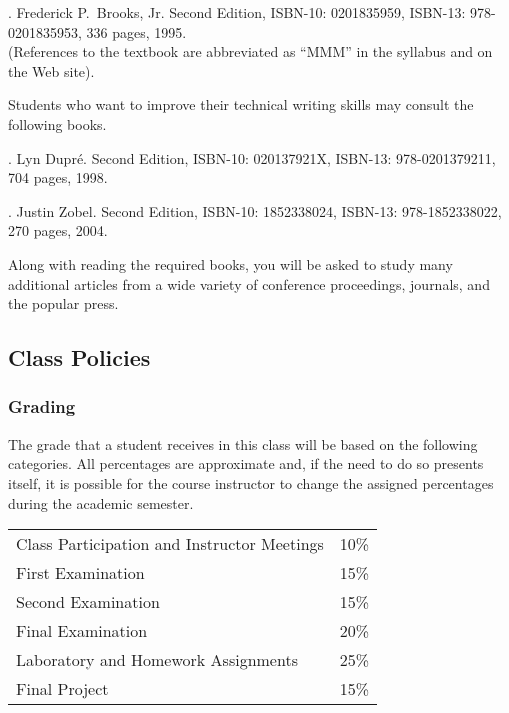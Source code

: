 . Frederick P.\ Brooks, Jr.
Second Edition, ISBN-10: 0201835959, ISBN-13: 978-0201835953, 336 pages, 1995. \\
(References to the textbook are abbreviated as ``MMM'' in the syllabus and on the Web site).

\noindent
Students who want to improve their technical writing skills may consult the following books.

. Lyn Dupr\'e. Second Edition,  ISBN-10: 020137921X,
ISBN-13: 978-0201379211, 704 pages, 1998.

.  Justin Zobel. Second Edition,  ISBN-10: 1852338024, ISBN-13:
978-1852338022, 270 pages, 2004.

\noindent
Along with reading the required books, you will be asked to study many additional articles from a wide variety of
conference proceedings, journals, and the popular press.

\subsection*{Class Policies}

\subsubsection*{Grading}

The grade that a student receives in this class will be based on the following categories. All percentages are
approximate and, if the need to do so presents itself, it is possible for the course instructor to change the assigned
percentages during the academic semester.


\begin{center}
\begin{tabular}{ll}
Class Participation and Instructor Meetings & 10\% \\
First Examination & 15\% \\
Second Examination & 15\% \\
Final Examination & 20\% \\
Laboratory and Homework Assignments & 25\% \\
Final Project & 15\%
\end{tabular}
\end{center}

